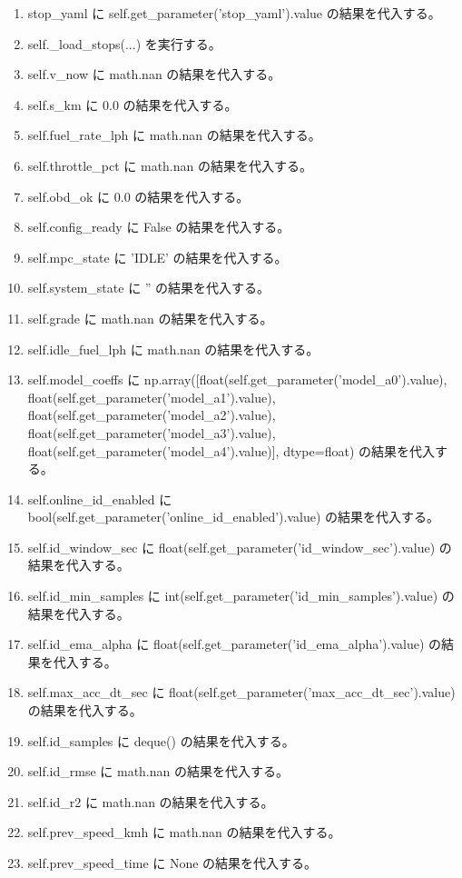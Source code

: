 \documentclass[a4paper,11pt]{article}
\begin{document}
\begin{enumerate}[leftmargin=1.8em]
\item stop\_yaml に self.get\_parameter('stop\_yaml').value の結果を代入する。
\item self.\_load\_stops(...) を実行する。
\item self.v\_now に math.nan の結果を代入する。
\item self.s\_km に 0.0 の結果を代入する。
\item self.fuel\_rate\_lph に math.nan の結果を代入する。
\item self.throttle\_pct に math.nan の結果を代入する。
\item self.obd\_ok に 0.0 の結果を代入する。
\item self.config\_ready に False の結果を代入する。
\item self.mpc\_state に 'IDLE' の結果を代入する。
\item self.system\_state に '' の結果を代入する。
\item self.grade に math.nan の結果を代入する。
\item self.idle\_fuel\_lph に math.nan の結果を代入する。
\item self.model\_coeffs に np.array([float(self.get\_parameter('model\_a0').value), float(self.get\_parameter('model\_a1').value), float(self.get\_parameter('model\_a2').value), float(self.get\_parameter('model\_a3').value), float(self.get\_parameter('model\_a4').value)], dtype=float) の結果を代入する。
\item self.online\_id\_enabled に bool(self.get\_parameter('online\_id\_enabled').value) の結果を代入する。
\item self.id\_window\_sec に float(self.get\_parameter('id\_window\_sec').value) の結果を代入する。
\item self.id\_min\_samples に int(self.get\_parameter('id\_min\_samples').value) の結果を代入する。
\item self.id\_ema\_alpha に float(self.get\_parameter('id\_ema\_alpha').value) の結果を代入する。
\item self.max\_acc\_dt\_sec に float(self.get\_parameter('max\_acc\_dt\_sec').value) の結果を代入する。
\item self.id\_samples に deque() の結果を代入する。
\item self.id\_rmse に math.nan の結果を代入する。
\item self.id\_r2 に math.nan の結果を代入する。
\item self.prev\_speed\_kmh に math.nan の結果を代入する。
\item self.prev\_speed\_time に None の結果を代入する。

\end{enumerate}
\end{document}
